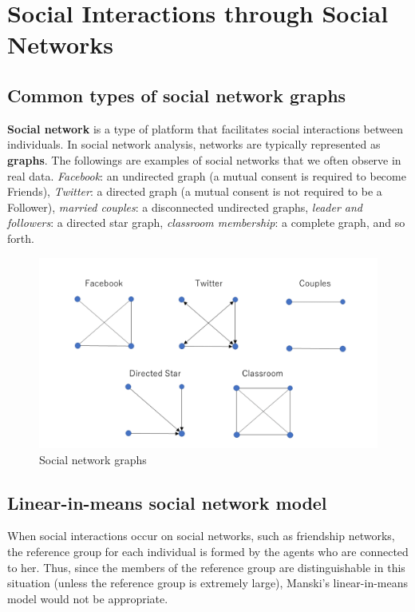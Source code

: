 \documentclass[10.5pt, A4paper, openany, uplatex]{book}
\numberwithin{equation}{section}
\begin{document}


\chapter{Social Interactions through Social Networks}\label{chap:social_network}
\section{Common types of social network graphs}

\textbf{Social network} is a type of platform that facilitates social interactions between individuals. 
In social network analysis, networks are typically represented as \textbf{graphs}.
The followings are examples of social networks that we often observe in real data.
\textit{Facebook}: an undirected graph (a mutual consent is required to become Friends), \textit{Twitter}: a directed graph (a mutual consent is not required to be a Follower), \textit{married couples}: a disconnected undirected graphs, \textit{leader and followers}: a directed star graph, \textit{classroom membership}: a complete graph, and so forth.

\begin{figure}[h!]
	\begin{center}
		\includegraphics[width = 14cm]{snets.png}
		\caption{Social network graphs}
	\end{center}
\end{figure}

\section{Linear-in-means social network model}

When social interactions occur on social networks, such as friendship networks, the reference group for each individual is formed by the agents who are connected to her.
Thus, since the members of the reference group are distinguishable in this situation (unless the reference group is extremely large), Manski's linear-in-means model would not be appropriate.
\end{document}
